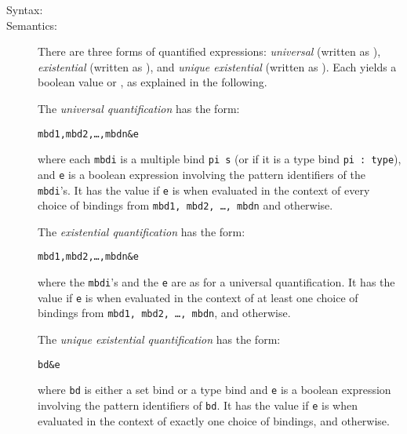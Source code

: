 \documentclass[\pformat,12pt]{article}
\begin{document}
\begin{description}
\item[Syntax:]


    



\item[Semantics:] There are three forms of quantified expressions:
  {\it universal} (written as ), {\it existential} (written
  as ), and {\it unique existential} (written as
  ). Each yields a boolean value  or , as
  explained in the following.

  The {\it universal quantification} has the form:
  \begin{alltt}
     mbd1, mbd2, \ldots, mbdn \& e
  \end{alltt}
  where each {\tt mbdi} is a multiple bind {\tt pi  s} (or
  if it is a type bind {\tt pi : type}), and {\tt e} is a boolean
  expression involving the pattern identifiers of the {\tt mbdi}'s. It
  has the value  if {\tt e} is  when evaluated in the
  context of every choice of bindings from {\tt mbd1, mbd2, \ldots,
    mbdn} and  otherwise.

  The {\it existential quantification} has the form:
  \begin{alltt}
     mbd1, mbd2, \ldots, mbdn \& e
  \end{alltt}
  where the {\tt mbdi}'s and the {\tt e} are as for a universal
  quantification. It has the value  if {\tt e} is  when
  evaluated in the context of at least one choice of bindings from
  {\tt mbd1, mbd2, \ldots, mbdn}, and  otherwise.

  The {\it unique existential quantification} has the form:
  \begin{alltt}
     bd \& e
  \end{alltt}
  where {\tt bd} is either a set bind or a type bind and {\tt e} is a
  boolean expression involving the pattern identifiers of {\tt bd}. It
  has the value  if {\tt e} is  when evaluated in the
  context of exactly one choice of bindings, and  otherwise.


\end{description}
\end{document}
